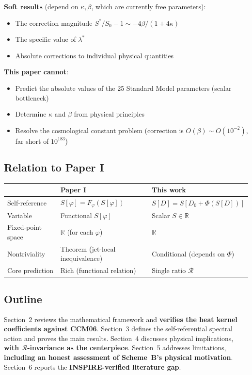 \documentclass[11pt,a4paper]{article}
\theoremstyle{remark}
\newcommand{\R}{\mathcal{R}}
\newcommand{\kappabeta}{\kappa, \beta}
\begin{document}
\textbf{Soft results} (depend on $\kappabeta$, which are currently free parameters):
\begin{itemize}
  \item The correction magnitude $S^*/S_0 - 1 \sim -4\beta/(1+4\kappa)$
  \item The specific value of $\lambda^*$
  \item Absolute corrections to individual physical quantities
\end{itemize}

\textbf{This paper cannot}:
\begin{itemize}
  \item Predict the absolute values of the 25 Standard Model parameters (scalar bottleneck)
  \item Determine $\kappa$ and $\beta$ from physical principles
  \item Resolve the cosmological constant problem (correction is $O(\beta) \sim O(10^{-2})$, far short of $10^{183}$)
\end{itemize}

\subsection{Relation to Paper I}

\begin{table}[h]
\centering
\begin{tabular}{lll}
\toprule
 & Paper I & This work \\
\midrule
Self-reference & $S[\varphi] = F_\varphi(S[\varphi])$ & $S[D] = S[D_0 + \Phi(S[D])]$ \\
Variable & Functional $S[\varphi]$ & Scalar $S \in \mathbb{R}$ \\
Fixed-point space & $\mathbb{R}$ (for each $\varphi$) & $\mathbb{R}$ \\
Nontriviality & Theorem (jet-local inequivalence) & Conditional (depends on $\Phi$) \\
Core prediction & Rich (functional relation) & Single ratio $\R$ \\
\bottomrule
\end{tabular}
\end{table}

\subsection{Outline}

Section~2 reviews the mathematical framework and \textbf{verifies the heat kernel coefficients against CCM06}. Section~3 defines the self-referential spectral action and proves the main results. Section~4 discusses physical implications, \textbf{with $\R$-invariance as the centerpiece}. Section~5 addresses limitations, \textbf{including an honest assessment of Scheme~B's physical motivation}. Section~6 reports the \textbf{INSPIRE-verified literature gap}.
\end{document}
